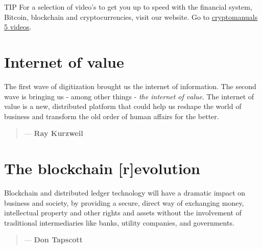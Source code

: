     \begin{tipbox}{TIP}
        For a selection of video's to get you up to speed with the financial system, Bitcoin, blockchain and cryptocurrencies, visit our website.
        \tcblower
        Go to \href{https://cryptomanuals.com/5-videos-to-start-with-bitcoin}{cryptomanuals 5 videos}.
    \end{tipbox}

\section*{Internet of value}
The first wave of digitization brought us the internet of information. The second wave is bringing us - among other things - \emph{the internet of value}. The internet of value is a new, distributed platform that could help us reshape the world of business and transform the old order of human affairs for the better.

    \begin{quotation}
        \textit{}
        \begin{flushright}
        \small{--- \textbf{Ray Kurzweil}}
        \end{flushright}
    \end{quotation}

\section*{The blockchain [r]evolution}
Blockchain and distributed ledger technology will have a dramatic impact on business and society, by providing a secure, direct way of exchanging money, intellectual property and other rights and assets without the involvement of traditional intermediaries like banks, utility companies, and governments. 
 
     \medskip
     \begin{quotation}
          \textit{}
          \begin{flushright}
            \small{--- \textbf{Don Tapscott}}
          \end{flushright}
    \end{quotation}

